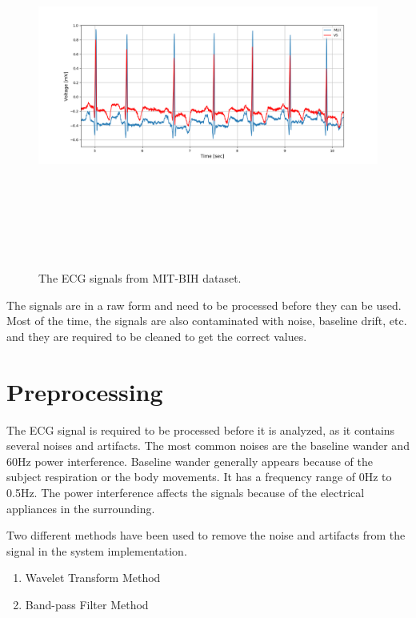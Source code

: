 \begin{figure}[h]
	\centering
	\includegraphics[width=15cm,height=12cm,keepaspectratio=true]{images/all_signals}
	\caption{
		The ECG signals from MIT-BIH dataset.
	}
	\label{fig:all_signals}
\end{figure}


The signals are in a raw form and need to be processed before they can be used. Most of the time, the signals are also contaminated with noise, baseline drift, etc. and they are required to be cleaned to get the correct values. 


\section{Preprocessing}
The ECG signal is required to be processed before it is analyzed, as it contains several noises and artifacts. The most common noises are the baseline wander and 60Hz power interference. Baseline wander generally appears because of the subject respiration or the body movements. It has a frequency range of 0Hz to 0.5Hz. The power interference affects the signals because of the electrical appliances in the surrounding.

Two different methods have been used to remove the noise and artifacts from the signal in the system implementation.

\begin{enumerate}
	\item Wavelet Transform Method
	\item Band-pass Filter Method
\end{enumerate}

